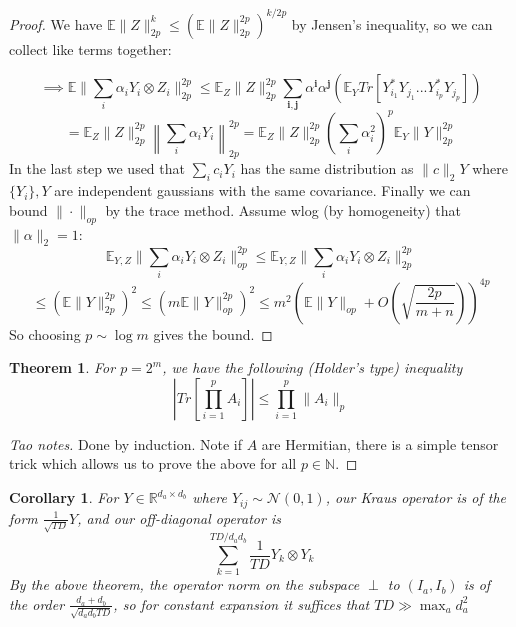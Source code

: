 \documentclass{article}
\newtheorem{theorem}{Theorem}
\newtheorem{corollary}{Corollary}
\newtheorem{claim}[theorem]{Claim}
\newcommand{\R}{{\mathbb{R}}}
\renewcommand{\vec}{\bm}
\newcommand{\E}{\mathbb{E}}
\begin{document}
\begin{proof}
We have $\E \|Z\|_{2p}^{k} \leq ( \E \|Z\|_{2p}^{2p} )^{k/2p}$ by Jensen's inequality, so we can collect like terms together:


\[ \implies \E \|\sum_{i} \alpha_{i} Y_{i} \otimes Z_{i}\|_{2p}^{2p}
\leq \E_{Z} \|Z\|_{2p}^{2p} \sum_{\vec{i},\vec{j}} \alpha^{\vec{i}} \alpha^{\vec{j}} (\E_{Y} Tr [ Y_{i_{1}}^{*} Y_{j_{1}} ... Y_{i_{p}}^{*} Y_{j_{p}} ] ) \]
\[ = \E_{Z} \|Z\|_{2p}^{2p} \left\| \sum_{i} \alpha_{i} Y_{i} \right\|_{2p}^{2p}
= \E_{Z} \|Z\|_{2p}^{2p} \left( \sum_{i} \alpha_{i}^{2} \right)^{p} \E_{Y} \|Y\|_{2p}^{2p}     \]
In the last step we used that $\sum_{i} c_{i} Y_{i}$ has the same distribution as $\|c\|_{2} Y$ where $\{Y_{i}\}, Y$ are independent gaussians with the same covariance.
Finally we can bound $\|\cdot\|_{op}$ by the trace method. Assume wlog (by homogeneity) that $\|\alpha\|_{2} = 1$:
\[ \E_{Y,Z} \|\sum_{i} \alpha_{i} Y_{i} \otimes Z_{i} \|_{op}^{2p} \leq \E_{Y,Z} \|\sum_{i} \alpha_{i} Y_{i} \otimes Z_{i} \|_{2p}^{2p} \]
\[ \leq ( \E \|Y\|_{2p}^{2p} )^{2} \leq ( m \E \|Y\|_{op}^{2p} )^{2} \leq m^{2} \left(\E \|Y\|_{op} + O(\sqrt{\frac{2p}{m+n}}) \right)^{4p} \]
So choosing $p \sim \log m$ gives the bound.
\end{proof}

\begin{theorem}
For $p = 2^{m}$, we have the following (Holder's type) inequality
\[ |Tr[\prod_{i=1}^{p} A_{i}]| \leq \prod_{i=1}^{p} \|A_{i}\|_{p}   \]
\end{theorem}
\begin{proof} [Tao notes]
Done by induction. Note if $A$ are Hermitian, there is a simple tensor trick which allows us to prove the above for all $p \in \mathbb{N}$.
\end{proof}

\begin{corollary}
For $Y \in \R^{d_{a} \times d_{b}}$ where $Y_{ij} \sim \mathcal{N}(0,1)$, our Kraus operator is of the form $\frac{1}{\sqrt{TD}} Y$, and our off-diagonal operator is
\[ \sum_{k=1}^{TD/d_{a}d_{b}} \frac{1}{TD} Y_{k} \otimes Y_{k}   \]
By the above theorem, the operator norm on the subspace $\perp$ to $(I_{a},I_{b})$ is of the order $\frac{d_{a}+d_{b}}{\sqrt{d_{a} d_{b} TD}}$, so for constant expansion it suffices that $TD \gg \max_{a} d_{a}^{2}$
\end{corollary}
\end{document}
